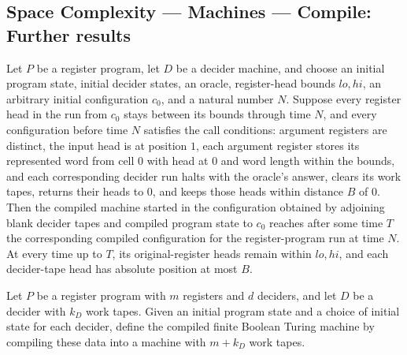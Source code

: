 \subsection*{Space Complexity --- Machines --- Compile: Further results}

\begin{theorem}
\label{Complexity.LogProg.compile_correct_from}
\leanok
{}
Let $P$ be a register program, let $D$ be a decider machine, and choose an initial
program state, initial decider states, an oracle, register-head bounds $lo,hi$, an
arbitrary initial configuration $c_0$, and a natural number $N$. Suppose every register
head in the run from $c_0$ stays between its bounds through time $N$, and every
configuration before time $N$ satisfies the call conditions: argument registers are
distinct, the input head is at position $1$, each argument register stores its
represented word from cell $0$ with head at $0$ and word length within the bounds, and
each corresponding decider run halts with the oracle's answer, clears its work tapes,
returns their heads to $0$, and keeps those heads within distance $B$ of $0$. Then the
compiled machine started in the configuration obtained by adjoining blank decider tapes
and compiled program state to $c_0$ reaches after some time $T$ the corresponding
compiled configuration for the register-program run at time $N$. At every time up to
$T$, its original-register heads remain within $lo,hi$, and each decider-tape head has
absolute position at most $B$.
\end{theorem}

\begin{definition}
\label{Complexity.LogProg.compileFinTM}
\leanok
{}
Let $P$ be a register program with $m$ registers and $d$ deciders, and let $D$ be a
decider with $k_D$ work tapes. Given an initial program state and a choice of initial
state for each decider, define the compiled finite Boolean Turing machine by compiling
these data into a machine with $m+k_D$ work tapes.
\end{definition}
